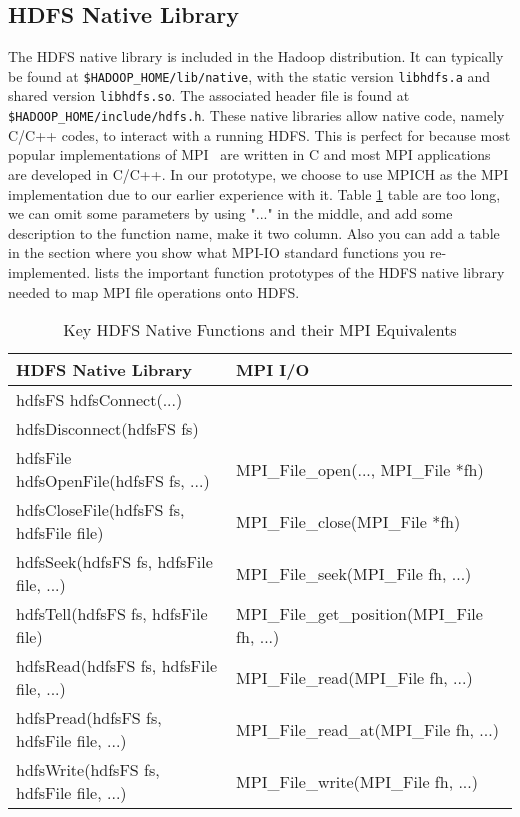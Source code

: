 \subsection{HDFS Native Library}
The HDFS native library is included in the Hadoop distribution. It can typically
be found at \texttt{\$HADOOP\_HOME/lib/native}, with the static version
\texttt{libhdfs.a} and shared version \texttt{libhdfs.so}. The associated header
file is found at \texttt{\$HADOOP\_HOME/include/hdfs.h}. These native libraries
allow native code, namely C/C++ codes, to interact with a running HDFS. This is perfect for
{\proj} because most popular implementations of MPI~\cite{mpich, openmpi} are written in C and most
MPI applications are developed in C/C++. In our prototype, we choose to use
MPICH as the MPI implementation due to our earlier experience with it.
Table \ref{table:libhdfs} {\color{red} table are too long, we can omit some
parameters by using "..." in the middle, and add some description to the
function name, make it two column. Also you can add a table in the section where
you show what MPI-IO standard functions you re-implemented. }
lists the important function prototypes of the HDFS native library needed to map
MPI file operations onto HDFS.

\begin{table}[ht]
\caption{Key HDFS Native Functions and their MPI Equivalents}
{\ttfamily
\begin{tabular}{l l}
\hline
HDFS Native Library & MPI I/O \\
\hline
hdfsFS hdfsConnect(...) & \\
hdfsDisconnect(hdfsFS fs) & \\
hdfsFile hdfsOpenFile(hdfsFS fs, ...) & MPI\_File\_open(..., MPI\_File *fh) \\
hdfsCloseFile(hdfsFS fs, hdfsFile file) & MPI\_File\_close(MPI\_File *fh) \\
hdfsSeek(hdfsFS fs, hdfsFile file, ...) & MPI\_File\_seek(MPI\_File fh, ...)\\
hdfsTell(hdfsFS fs, hdfsFile file) & MPI\_File\_get\_position(MPI\_File fh, ...)\\
hdfsRead(hdfsFS fs, hdfsFile file, ...) & MPI\_File\_read(MPI\_File fh, ...)\\
hdfsPread(hdfsFS fs, hdfsFile file, ...) & MPI\_File\_read\_at(MPI\_File fh, ...)\\
hdfsWrite(hdfsFS fs, hdfsFile file, ...) & MPI\_File\_write(MPI\_File fh, ...)\\
\hline
\end{tabular}
}
\label{table:libhdfs}
\end{table}
					
